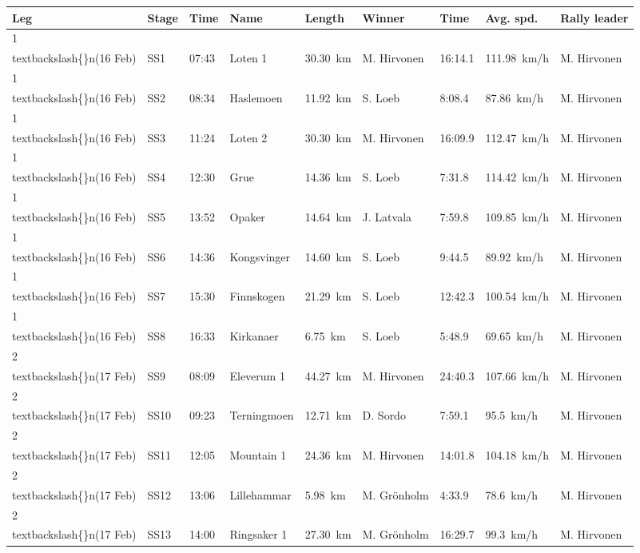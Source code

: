 \documentclass{article}
\begin{document}
\begin{tabular}{lllllllll}
\toprule
Leg & Stage & Time & Name & Length & Winner & Time & Avg. spd. & Rally leader \\
\midrule
1\\textbackslash\{\}n(16 Feb) & SS1 & 07:43 & Loten 1 & 30.30 km & M. Hirvonen & 16:14.1 & 111.98 km/h & M. Hirvonen \\
1\\textbackslash\{\}n(16 Feb) & SS2 & 08:34 & Haslemoen & 11.92 km & S. Loeb & 8:08.4 & 87.86 km/h & M. Hirvonen \\
1\\textbackslash\{\}n(16 Feb) & SS3 & 11:24 & Loten 2 & 30.30 km & M. Hirvonen & 16:09.9 & 112.47 km/h & M. Hirvonen \\
1\\textbackslash\{\}n(16 Feb) & SS4 & 12:30 & Grue & 14.36 km & S. Loeb & 7:31.8 & 114.42 km/h & M. Hirvonen \\
1\\textbackslash\{\}n(16 Feb) & SS5 & 13:52 & Opaker & 14.64 km & J. Latvala & 7:59.8 & 109.85 km/h & M. Hirvonen \\
1\\textbackslash\{\}n(16 Feb) & SS6 & 14:36 & Kongsvinger & 14.60 km & S. Loeb & 9:44.5 & 89.92 km/h & M. Hirvonen \\
1\\textbackslash\{\}n(16 Feb) & SS7 & 15:30 & Finnskogen & 21.29 km & S. Loeb & 12:42.3 & 100.54 km/h & M. Hirvonen \\
1\\textbackslash\{\}n(16 Feb) & SS8 & 16:33 & Kirkanaer & 6.75 km & S. Loeb & 5:48.9 & 69.65 km/h & M. Hirvonen \\
2\\textbackslash\{\}n(17 Feb) & SS9 & 08:09 & Eleverum 1 & 44.27 km & M. Hirvonen & 24:40.3 & 107.66 km/h & M. Hirvonen \\
2\\textbackslash\{\}n(17 Feb) & SS10 & 09:23 & Terningmoen & 12.71 km & D. Sordo & 7:59.1 & 95.5 km/h & M. Hirvonen \\
2\\textbackslash\{\}n(17 Feb) & SS11 & 12:05 & Mountain 1 & 24.36 km & M. Hirvonen & 14:01.8 & 104.18 km/h & M. Hirvonen \\
2\\textbackslash\{\}n(17 Feb) & SS12 & 13:06 & Lillehammar & 5.98 km & M. Grönholm & 4:33.9 & 78.6 km/h & M. Hirvonen \\
2\\textbackslash\{\}n(17 Feb) & SS13 & 14:00 & Ringsaker 1 & 27.30 km & M. Grönholm & 16:29.7 & 99.3 km/h & M. Hirvonen \\

\end{tabular}
\end{document}
